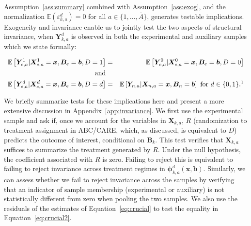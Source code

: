 Assumption~\ref{ass:summary} combined with Assumption~\ref{ass:exog}, and the normalization $\mathbb{E}(\varepsilon^d_{k,a})=0$ for all $a \in \{1,\dots,\bar{A}\}$, generates testable implications. Exogeneity and invariance enable us to jointly test the two aspects of structural invariance, when $\bm{Y}^d_{k,a}$ is observed in both the experimental and auxiliary samples which we state formally:

\begin{eqnarray}
\mathbb{E} \left[ \bm{Y}_{e,a}^1 | \bm{X}_{e,a}^1 = \bm{x}, \bm{B}_{e} = \bm{b}, D = 1   \right] &=&  \mathbb{E} \left[ \bm{Y}_{e,a}^0 | \bm{X}_{e,a}^0 = \bm{x}, \bm{B}_{e} = \bm{b}, D = 0   \right] \label{eq:suff1}  \\
\text{ and} & \nonumber \\
\mathbb{E} \left[ \bm{Y}_{e,a}^d | \bm{X}_{e,a}^d = \bm{x}, \bm{B}_{e} = \bm{b}, D = d   \right] &=&  \mathbb{E} \left[ \bm{Y}_{n,a} | \bm{X}_{n,a} = \bm{x}, \bm{B}_{n} = \bm{b} \right] \text{ for }  d \in \{0,1\}. \label{eq:suff2}\footnotemark
\end{eqnarray}

We briefly summarize tests for these implications here and present a more extensive discussion in Appendix~\ref{app:invariance}. We first use the experimental sample and ask if, once we account for the variables in $\bm{X}_{k,a}$, $R$ (randomization to treatment assignment in ABC/CARE, which, as discussed, is equivalent to $D$) predicts the outcome of interest, conditional on $\bm{B}_k$. This test verifies that $\bm{X}_{k,a}$ suffices to summarize the treatment generated by $R$. Under the null hypothesis, the coefficient associated with $R$ is zero. Failing to reject this is equivalent to failing to reject invariance across treatment regimes in $\bm{\phi}_{k,a}^d \left( \bm{x}, \bm{b} \right)$. Similarly, we can assess whether we fail to reject invariance across the samples by verifying that an indicator of sample membership (experimental or auxiliary) is not statistically different from zero when pooling the two samples. We also use the residuals of the estimates of Equation~\eqref{eq:crucial} to test the equality in Equation~\eqref{eq:crucial2}.

